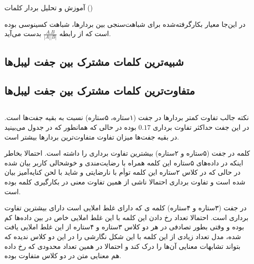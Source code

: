 \Section
{آموزش و تحلیل بردار کلمات ()}
{
در این‌جا معیار بکارگرفته‌شده برای شباهت‌سنجی بین بردارها، شباهت کسینوسی بوده است که از رابطه
$\frac{A.B}{|A||B|}$
بدست می‌آید.

\subsection{شبیه‌ترین کلمات مشترک بین جفت لیبل‌ها}
{

\begin{adjustbox}{width=\textwidth}
\end{adjustbox}

}
\subsection{متفاوت‌ترین کلمات مشترک بین جفت لیبل‌ها}
{

\begin{adjustbox}{width=\textwidth}
\end{adjustbox}
$\quad$

نکته جالب تفاوت کمتر بردارها در جفت (۱ستاره، ۵ستاره) نسبت به بقیه جفت‌ها است. در این جفت حداکثر تفاوت برداری $0.17$ بوده در حالی که همانطور که در جدول می‌بینید در بقیه جفت‌ها میزان تفاوت متفاوت‌ترین بردارها بیشتر است.

کلمه‌ 
در جفت (۵ستاره و ۲ستاره) بیشترین تفاوت برداری را داشته است. احتمالا بخاطر اینکه در داده‌های ۵ستاره این کلمه همراه با رضایت‌مندی و خوشحالی کاربر بیان شده در حالی که در کلاس ۲ستاره این کلمه توأم با نارضایتی و شاید با لحن کنایه‌آمیز بیان شده است و تفاوت برداری احتمالا ناشی از همین تفاوت معنی در بکارگیری کلمه بوده است.

در جفت 
(۳ستاره و ۴ستاره)
کلمه ی 
که دارای غلط املایی است دارای بیشترین تفاوت برداری است. احتمالا تعداد رخ دادن این کلمه با این غلط املایی خاص در بین داده‌ها کم بوده و وقتی بطور تصادفی در هر دو کلاس ۳ستاره و ۴ستاره از این غلط املایی یافت شده، مدل تعداد زیادی از این کلمه با این شکل نگارشی را در این دو کلاس ندیده که بتواند تشابهات معنایی آن‌ها را درک کند و احتمالا در همین تعداد محدودی که رخ داده هم  معنایی متن در دو کلاس متفاوت بوده.

}
}